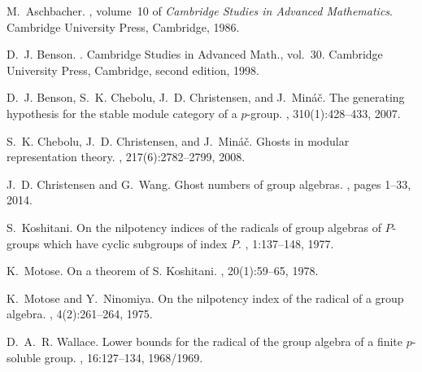 \documentclass[12pt,reqno]{amsart}
\theoremstyle{definition}
\theoremstyle{remark}
\begin{document}
\begin{thebibliography}{1}

M.~Aschbacher.
, volume~10 of {\em Cambridge Studies in
  Advanced Mathematics}.
\newblock Cambridge University Press, Cambridge, 1986.

D.~J. Benson.
.
\newblock Cambridge Studies in Advanced Math., vol.~30. Cambridge University
  Press, Cambridge, second edition, 1998.

D.~J. Benson, S.~K. Chebolu, J.~D. Christensen, and J.~Min{\'a}{\v{c}}.
\newblock The generating hypothesis for the stable module category of a
  {$p$}-group.
, 310(1):428--433, 2007.

S.~K. Chebolu, J.~D. Christensen, and J.~Min{\'a}{\v{c}}.
\newblock Ghosts in modular representation theory.
, 217(6):2782--2799, 2008.

J.~D. Christensen and G.~Wang.
\newblock Ghost numbers of group algebras.
, pages 1--33, 2014.

S.~Koshitani.
\newblock On the nilpotency indices of the radicals of group algebras of
  {$P$}-groups which have cyclic subgroups of index {$P$}.
, 1:137--148, 1977.

K.~Motose.
\newblock On a theorem of {S}. {K}oshitani.
, 20(1):59--65, 1978.

K.~Motose and Y.~Ninomiya.
\newblock On the nilpotency index of the radical of a group algebra.
, 4(2):261--264, 1975.

D.~A.~R. Wallace.
\newblock Lower bounds for the radical of the group algebra of a finite
  {$p$}-soluble group.
, 16:127--134, 1968/1969.

\end{thebibliography}
\end{document}
